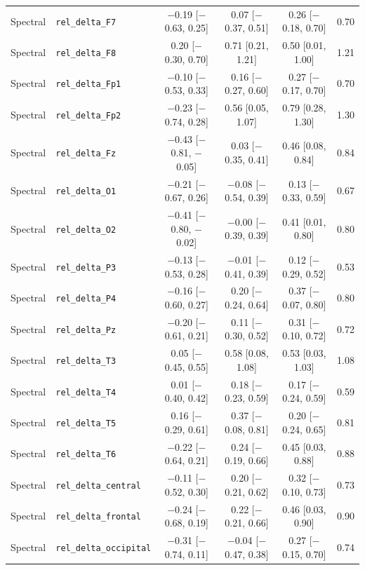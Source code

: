 {\begin{longtable}{llcccc}
Spectral & \texttt{rel\_delta\_F7} & $-$0.19 [$-$0.63, 0.25] & 0.07 [$-$0.37, 0.51] & 0.26 [$-$0.18, 0.70] & 0.70 \\
Spectral & \texttt{rel\_delta\_F8} & 0.20 [$-$0.30, 0.70] & 0.71 [0.21, 1.21] & 0.50 [0.01, 1.00] & 1.21 \\
Spectral & \texttt{rel\_delta\_Fp1} & $-$0.10 [$-$0.53, 0.33] & 0.16 [$-$0.27, 0.60] & 0.27 [$-$0.17, 0.70] & 0.70 \\
Spectral & \texttt{rel\_delta\_Fp2} & $-$0.23 [$-$0.74, 0.28] & 0.56 [0.05, 1.07] & 0.79 [0.28, 1.30] & 1.30 \\
Spectral & \texttt{rel\_delta\_Fz} & $-$0.43 [$-$0.81, $-$0.05] & 0.03 [$-$0.35, 0.41] & 0.46 [0.08, 0.84] & 0.84 \\
Spectral & \texttt{rel\_delta\_O1} & $-$0.21 [$-$0.67, 0.26] & $-$0.08 [$-$0.54, 0.39] & 0.13 [$-$0.33, 0.59] & 0.67 \\
Spectral & \texttt{rel\_delta\_O2} & $-$0.41 [$-$0.80, $-$0.02] & $-$0.00 [$-$0.39, 0.39] & 0.41 [0.01, 0.80] & 0.80 \\
Spectral & \texttt{rel\_delta\_P3} & $-$0.13 [$-$0.53, 0.28] & $-$0.01 [$-$0.41, 0.39] & 0.12 [$-$0.29, 0.52] & 0.53 \\
Spectral & \texttt{rel\_delta\_P4} & $-$0.16 [$-$0.60, 0.27] & 0.20 [$-$0.24, 0.64] & 0.37 [$-$0.07, 0.80] & 0.80 \\
Spectral & \texttt{rel\_delta\_Pz} & $-$0.20 [$-$0.61, 0.21] & 0.11 [$-$0.30, 0.52] & 0.31 [$-$0.10, 0.72] & 0.72 \\
Spectral & \texttt{rel\_delta\_T3} & 0.05 [$-$0.45, 0.55] & 0.58 [0.08, 1.08] & 0.53 [0.03, 1.03] & 1.08 \\
Spectral & \texttt{rel\_delta\_T4} & 0.01 [$-$0.40, 0.42] & 0.18 [$-$0.23, 0.59] & 0.17 [$-$0.24, 0.59] & 0.59 \\
Spectral & \texttt{rel\_delta\_T5} & 0.16 [$-$0.29, 0.61] & 0.37 [$-$0.08, 0.81] & 0.20 [$-$0.24, 0.65] & 0.81 \\
Spectral & \texttt{rel\_delta\_T6} & $-$0.22 [$-$0.64, 0.21] & 0.24 [$-$0.19, 0.66] & 0.45 [0.03, 0.88] & 0.88 \\
Spectral & \texttt{rel\_delta\_central} & $-$0.11 [$-$0.52, 0.30] & 0.20 [$-$0.21, 0.62] & 0.32 [$-$0.10, 0.73] & 0.73 \\
Spectral & \texttt{rel\_delta\_frontal} & $-$0.24 [$-$0.68, 0.19] & 0.22 [$-$0.21, 0.66] & 0.46 [0.03, 0.90] & 0.90 \\
Spectral & \texttt{rel\_delta\_occipital} & $-$0.31 [$-$0.74, 0.11] & $-$0.04 [$-$0.47, 0.38] & 0.27 [$-$0.15, 0.70] & 0.74 \\

\end{longtable}}
